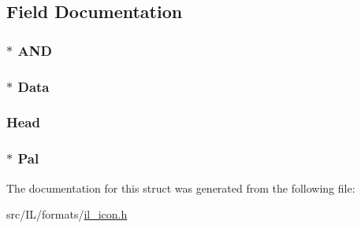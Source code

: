 \subsection{Field Documentation}
\hypertarget{struct_i_c_o_i_m_a_g_e_a0f578ed76f86adcb3c5fecd502f8636a}{
\subsubsection[{A\-N\-D}]{$\ast$ A\-N\-D}}\label{struct_i_c_o_i_m_a_g_e_a0f578ed76f86adcb3c5fecd502f8636a}
\hypertarget{struct_i_c_o_i_m_a_g_e_a32fd28ac5d89e3ef2f9151330af0149d}{
\subsubsection[{Data}]{$\ast$ Data}}\label{struct_i_c_o_i_m_a_g_e_a32fd28ac5d89e3ef2f9151330af0149d}
\hypertarget{struct_i_c_o_i_m_a_g_e_ace5292f75d3e50590fb9ab9ca96616a8}{
\subsubsection[{Head}]{ Head}}\label{struct_i_c_o_i_m_a_g_e_ace5292f75d3e50590fb9ab9ca96616a8}
\hypertarget{struct_i_c_o_i_m_a_g_e_a561a236b698c68d57abbac93ddd37815}{
\subsubsection[{Pal}]{$\ast$ Pal}}\label{struct_i_c_o_i_m_a_g_e_a561a236b698c68d57abbac93ddd37815}


The documentation for this struct was generated from the following file\-:\begin{DoxyCompactItemize}
\item 
src/\-I\-L/formats/\hyperlink{il__icon_8h}{il\-\_\-icon.\-h}\end{DoxyCompactItemize}
